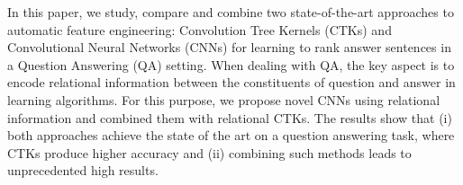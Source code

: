 In this paper, we study, compare and combine two state-of-the-art approaches to automatic feature engineering:              Convolution Tree Kernels (CTKs) and Convolutional Neural Networks (CNNs) for learning to rank answer sentences in a Question Answering (QA) setting. When dealing with QA, the key aspect is to encode relational information between the constituents of question and answer in learning algorithms. For this purpose, we propose novel CNNs using relational information and combined them with relational CTKs. The results show that (i) both approaches achieve the state of the art on a question answering task, where CTKs produce higher accuracy and (ii) combining such methods leads to unprecedented high results.
